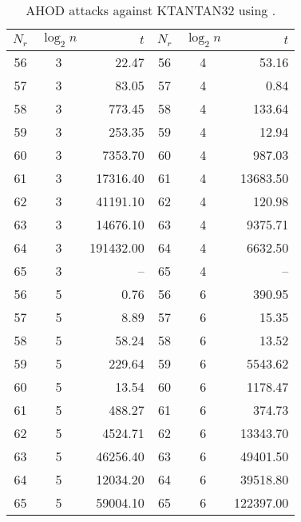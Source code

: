 \begin{table}[htbp]
\begin{center}
\begin{tabular}{|c|c|r||c|c|r|}
\hline
$N_r$ & $\log_2 n$ & $t$ & $N_r$ & $\log_2 n$ & $t$\\
\hline
56 & 3 &     22.47 & 56 & 4 &    53.16\\
57 & 3 &     83.05 & 57 & 4 &     0.84\\
58 & 3 &    773.45 & 58 & 4 &   133.64\\
59 & 3 &    253.35 & 59 & 4 &    12.94\\
60 & 3 &   7353.70 & 60 & 4 &   987.03\\
61 & 3 &  17316.40 & 61 & 4 & 13683.50\\
62 & 3 &  41191.10 & 62 & 4 &   120.98\\
63 & 3 &  14676.10 & 63 & 4 &  9375.71\\
64 & 3 & 191432.00 & 64 & 4 &  6632.50\\
65 & 3 &        -- & 65 & 4 &       --\\
\hline
56 & 5 &     0.76 & 56 & 6 &    390.95\\
57 & 5 &     8.89 & 57 & 6 &     15.35\\
58 & 5 &    58.24 & 58 & 6 &     13.52\\
59 & 5 &   229.64 & 59 & 6 &   5543.62\\
60 & 5 &    13.54 & 60 & 6 &   1178.47\\
61 & 5 &   488.27 & 61 & 6 &    374.73\\
62 & 5 &  4524.71 & 62 & 6 &  13343.70\\
63 & 5 & 46256.40 & 63 & 6 &  49401.50\\
64 & 5 & 12034.20 & 64 & 6 &  39518.80\\
65 & 5 & 59004.10 & 65 & 6 & 122397.00\\
\hline         
\end{tabular}
\end{center}
\caption{AHOD attacks against KTANTAN32 using \MiniSat.}
\label{tab:ahod-ktantan32-minisat}
\end{table}

